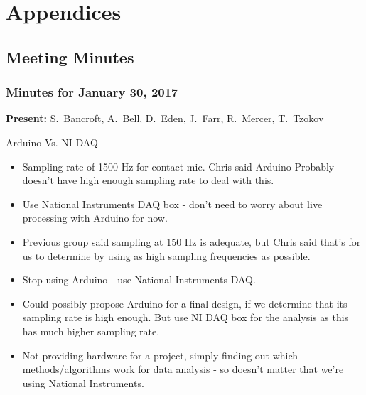 \appendix
\section{Appendices}
\subsection{Meeting Minutes}

\subsubsection*{Minutes for January 30, 2017}

\textbf{Present:} 
{S.~Bancroft,
  A.~Bell,
  D.~Eden,
  J.~Farr,
  R.~Mercer,
  T.~Tzokov}
  
\large{Arduino Vs. NI DAQ}
\begin{itemize}
\item
Sampling rate of 1500 Hz for contact mic. Chris said Arduino Probably doesn't have high enough sampling rate to deal with this.

\item
Use National Instruments DAQ box - don't need to worry about live processing with Arduino for now.

\item
Previous group said sampling at 150 Hz is adequate, but Chris said that's for us to determine by using as high sampling frequencies as possible.

\item
Stop using Arduino - use National Instruments DAQ.

\item
Could possibly propose Arduino for a final design, if we determine that its sampling rate is high enough. But use NI DAQ box for the analysis as this has much higher sampling rate.

\item
Not providing hardware for a project, simply finding out which methods/algorithms work for data analysis - so doesn't matter that we're using National Instruments.
\end{itemize}

